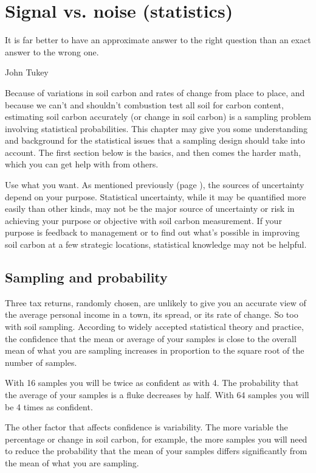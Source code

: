 \documentclass[11pt,letterpaper,oneside,onecolumn]{memoir}
\begin{document}
\chapter{Signal vs. noise (statistics)}

\epigraph{It is far better to have an approximate answer to the right question than an exact answer to the wrong one.}{John Tukey}

\noindent Because of variations in soil carbon and rates of change from place to place, and because we can't and shouldn't combustion test all soil for carbon content, estimating soil carbon accurately (or change in soil carbon) is a sampling problem involving statistical probabilities. This chapter may give you some understanding and background for the statistical issues that a sampling design should take into account. The first section below is the basics, and then comes the harder math, which you can get help with from others.

Use what you want. As mentioned previously (page \pageref{purpose}), the sources of uncertainty depend on your purpose. Statistical uncertainty, while it may be quantified more easily than other kinds, may not be the major source of uncertainty or risk in achieving your purpose or objective with soil carbon measurement. If your purpose is feedback to management or to find out what's possible in improving soil carbon at a few strategic locations, statistical knowledge may not be helpful.

\section{Sampling and probability}

Three tax returns, randomly chosen, are unlikely to give you an accurate view of the average personal income in a town, its spread, or its rate of change. So too with soil sampling. According to widely accepted statistical theory and practice, the confidence that the mean or average of your samples is close to the overall mean of what you are sampling increases in proportion to the square root of the number of samples.

With 16 samples you will be twice as confident as with 4. The probability that the average of your samples is a fluke decreases by half. With 64 samples you will be 4 times as confident.

The other factor that affects confidence is variability. The more variable the percentage or change in soil carbon, for example, the more samples you will need to reduce the probability that the mean of your samples differs significantly from the mean of what you are sampling.
\end{document}
